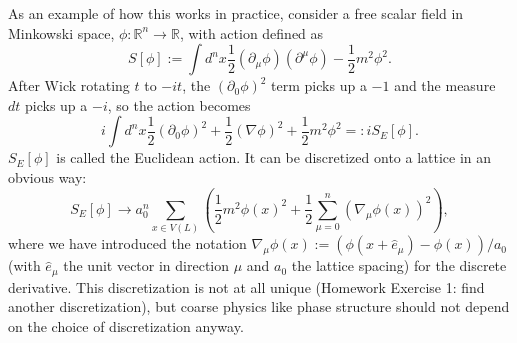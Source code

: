 \documentclass[9pt,twocolumn,twoside]{article}
\begin{document}
As an example of how this works in practice, consider a free scalar field in Minkowski space, $\phi:\mathbb{R}^n\rightarrow \mathbb{R}$, with action defined as 
\[S[\phi] := \int d^nx \frac{1}{2}(\partial_{\mu}\phi) (\partial^{\mu}\phi) - \frac{1}{2}m^2\phi^2.\]
After Wick rotating $t$ to $-it$, the $(\partial_0\phi)^2$ term picks up a $-1$ and the measure $dt$ picks up a $-i$, so the action becomes
\[i \int d^nx \frac{1}{2}(\partial_0\phi)^2 + \frac{1}{2}(\nabla\phi)^2 + \frac{1}{2}m^2\phi^2 =: i S_E[\phi].\]
$S_E[\phi]$ is called the Euclidean action.  It can be discretized onto a lattice in an obvious way:
\[ S_E[\phi] \rightarrow a_0^n \sum_{x\in V(L)} \left( \frac{1}{2}m^2\phi(x)^2 + \frac{1}{2} \sum_{\mu=0}^n (\nabla_{\mu} \phi(x))^2 \right),\]
where we have introduced the notation $\nabla_{\mu} \phi(x) := (\phi(x+\hat{e}_{\mu}) - \phi(x))/a_0$ (with $\hat{e}_{\mu}$ the unit vector in direction $\mu$ and $a_0$ the lattice spacing) for the discrete derivative.  This discretization is not at all unique (Homework Exercise 1: find another discretization), but coarse physics like phase structure should not depend on the choice of discretization anyway.  
\end{document}

